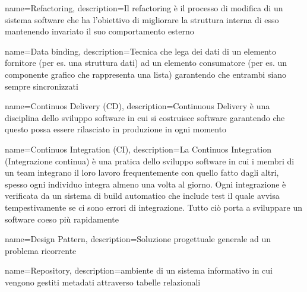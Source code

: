 {
	name=Refactoring,
	description={Il refactoring è il processo di modifica di un sistema software che ha l'obiettivo di migliorare la struttura interna di esso mantenendo invariato il suo comportamento esterno}
}

{
	name=Data binding,
	description={Tecnica che lega dei dati di un elemento fornitore (per es. una struttura dati) ad un elemento consumatore (per es. un componente grafico che rappresenta una lista) garantendo che entrambi siano sempre sincronizzati}
}

{
	name=Continuos Delivery (CD),
	description={Continuous Delivery è una disciplina dello sviluppo software in cui si costruisce software garantendo che questo possa essere rilasciato in produzione in ogni momento}
}

{
	name=Continuos Integration (CI),
	description={La Continuos Integration (Integrazione continua) è una pratica dello sviluppo software in cui i membri di un team integrano il loro lavoro frequentemente con quello fatto dagli altri, spesso ogni individuo integra almeno una volta al giorno. Ogni integrazione è verificata da un sistema di build automatico che include test il quale avvisa tempestivamente se ci sono errori di integrazione. Tutto ciò porta a sviluppare un software coeso più rapidamente\cite{duvall2007continuous}}
}

{
	name=Design Pattern,
	description={Soluzione progettuale generale ad un problema ricorrente}
}

{
	name=Repository,
	description={ambiente di un sistema informativo in cui vengono
gestiti metadati attraverso tabelle relazionali}
}
